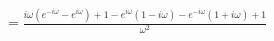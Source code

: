 \documentclass[preview]{standalone}
\begin{document}
\begin{align*}
&=\frac{i\omega(e^{-i\omega}-e^{i\omega})+1-e^{i\omega}(1-i\omega)-e^{-i\omega}(1+i\omega)+1}{\omega^{2}} \\
\end{align*}
\end{document}
